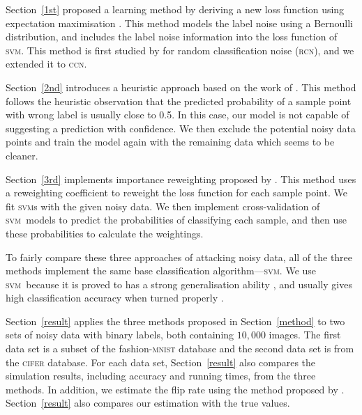\documentclass{article} %
\newcommand{\svm}{\textsc{svm}}
\begin{document}
Section~\ref{1st} proposed a learning method by deriving a new loss function using expectation maximisation \citep[p.423]{Bishop:2006:PRM:1162264}. This method models the label noise using a Bernoulli distribution, and includes the label noise information into the loss function of \svm. This method is first studied by \citet{pmlr-v20-biggio11} for random classification noise (\textsc{rcn}), and we extended it to \textsc{ccn}. 

Section~\ref{2nd} introduces a heuristic approach based on the work of \citet{Wu03probabilityestimates}. This method follows the heuristic observation that the predicted probability of a sample point with wrong label is usually close to 0.5. In this case, our model is not capable of suggesting a prediction with confidence. We then exclude the potential noisy data points and train the model again with the remaining data which seems to be cleaner. 

Section~\ref{3rd} implements importance reweighting proposed by \citet{liu2016classification}. This method uses a reweighting coefficient to reweight the loss function for each sample point. We fit \svm s with the given noisy data. We then implement cross-validation of \svm\ models to predict the probabilities of classifying each sample, and then use these probabilities to calculate the weightings.

To fairly compare these three approaches of attacking noisy data, all of the three methods implement the same base classification algorithm---\svm. We use \svm\ because it is proved to has a strong generalisation ability \citep{NIPS2012_4500,Seeger:2003:PGE:944919.944929,Cortes1995}, and usually gives high classification accuracy when turned properly \citep{Fernandez-Delgado:2014:WNH:2627435.2697065}. 

Section~\ref{result} applies the three methods proposed in Section~\ref{method} to two sets of noisy data with binary labels, both containing $10,000$ images. The first data set is a subset of the fashion-\textsc{mnist} database and the second data set is from the \textsc{cifer} database. For each data set, Section~\ref{result} also compares the simulation results, including accuracy and running times, from the three methods. In addition, we estimate the flip rate using the method proposed by \citet{liu2016classification}. 
Section~\ref{result} also compares our estimation with the true values.
\end{document}
